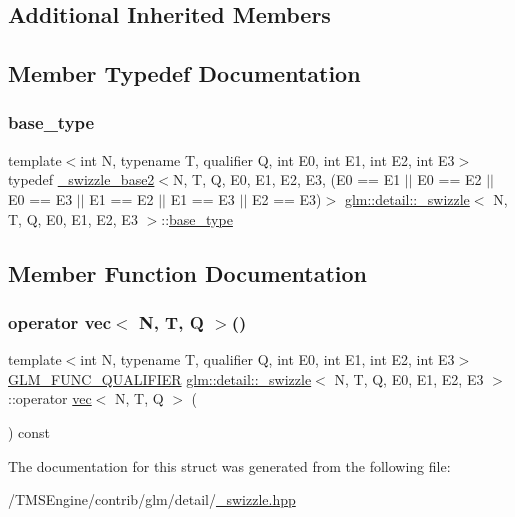\subsection*{Additional Inherited Members}


\subsection{Member Typedef Documentation}
\mbox{\label{structglm_1_1detail_1_1__swizzle_ac055459bca5651cfea9466ffd3a0daeb}} 
\subsubsection{\texorpdfstring{base\+\_\+type}{base\_type}}
{\footnotesize\ttfamily template$<$int N, typename T, qualifier Q, int E0, int E1, int E2, int E3$>$ \\
typedef \hyperlink{structglm_1_1detail_1_1__swizzle__base2}{\+\_\+swizzle\+\_\+base2}$<$N, T, Q, E0, E1, E2, E3, (E0 == E1 $\vert$$\vert$ E0 == E2 $\vert$$\vert$ E0 == E3 $\vert$$\vert$ E1 == E2 $\vert$$\vert$ E1 == E3 $\vert$$\vert$ E2 == E3)$>$ \hyperlink{structglm_1_1detail_1_1__swizzle}{glm\+::detail\+::\+\_\+swizzle}$<$ N, T, Q, E0, E1, E2, E3 $>$\+::\hyperlink{structglm_1_1detail_1_1__swizzle_ac055459bca5651cfea9466ffd3a0daeb}{base\+\_\+type}}



\subsection{Member Function Documentation}
\mbox{\label{structglm_1_1detail_1_1__swizzle_ab4237b43cd0b0b081668ba6ab1072903}} 
\subsubsection{\texorpdfstring{operator vec$<$ N, T, Q $>$()}{operator vec< N, T, Q >()}}
{\footnotesize\ttfamily template$<$int N, typename T, qualifier Q, int E0, int E1, int E2, int E3$>$ \\
\hyperlink{setup_8hpp_a33fdea6f91c5f834105f7415e2a64407}{G\+L\+M\+\_\+\+F\+U\+N\+C\+\_\+\+Q\+U\+A\+L\+I\+F\+I\+ER} \hyperlink{structglm_1_1detail_1_1__swizzle}{glm\+::detail\+::\+\_\+swizzle}$<$ N, T, Q, E0, E1, E2, E3 $>$\+::operator \hyperlink{structglm_1_1vec}{vec}$<$ N, T, Q $>$ (\begin{DoxyParamCaption}{ }\end{DoxyParamCaption}) const\hspace{0.3cm}{\ttfamily [inline]}}



The documentation for this struct was generated from the following file\+:\begin{DoxyCompactItemize}
\item 
/\+T\+M\+S\+Engine/contrib/glm/detail/\hyperlink{__swizzle_8hpp}{\+\_\+swizzle.\+hpp}\end{DoxyCompactItemize}
